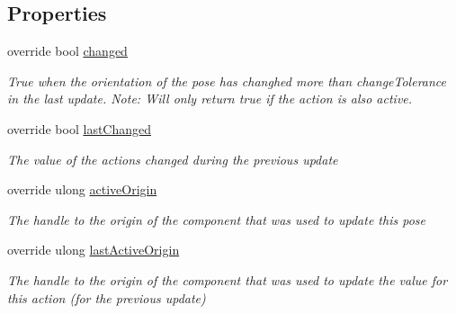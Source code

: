 \subsection*{Properties}
\begin{DoxyCompactItemize}
\item 
override bool \mbox{\hyperlink{class_valve_1_1_v_r_1_1_steam_v_r___action___pose___source_abd28927b24762c29fed7b9debcf9bbc4}{changed}}
\begin{DoxyCompactList}\small\item\em True when the orientation of the pose has changhed more than change\+Tolerance in the last update. Note\+: Will only return true if the action is also active. \end{DoxyCompactList}\item 
override bool \mbox{\hyperlink{class_valve_1_1_v_r_1_1_steam_v_r___action___pose___source_a4761f3b3c89f794376359d900901189e}{last\+Changed}}
\begin{DoxyCompactList}\small\item\em The value of the action\textquotesingle{}s \textquotesingle{}changed\textquotesingle{} during the previous update \end{DoxyCompactList}\item 
override ulong \mbox{\hyperlink{class_valve_1_1_v_r_1_1_steam_v_r___action___pose___source_afd8401aa4cc0b923479e13617bc28159}{active\+Origin}}
\begin{DoxyCompactList}\small\item\em The handle to the origin of the component that was used to update this pose \end{DoxyCompactList}\item 
override ulong \mbox{\hyperlink{class_valve_1_1_v_r_1_1_steam_v_r___action___pose___source_a0e28c7700a0694b08cf85a4e68ed41e4}{last\+Active\+Origin}}
\begin{DoxyCompactList}\small\item\em The handle to the origin of the component that was used to update the value for this action (for the previous update) \end{DoxyCompactList}\item 

\end{DoxyCompactItemize}
